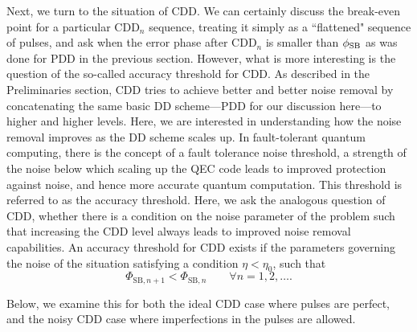 \documentclass[pra,reprint,superscriptaddress]{revtex4-2}
\newcommand{\CDDn}{\mathrm{CDD}_n}
\begin{document}



Next, we turn to the situation of CDD. We can certainly discuss the break-even point for a particular $\CDDn$ sequence, treating it simply as a ``flattened" sequence of pulses, and ask when the error phase after $\CDDn$ is smaller than $\phi_{\mathrm{SB}}$ as was done for PDD in the previous section. 
However, what is more interesting is the question of the so-called accuracy threshold for CDD.
As described in the Preliminaries section, CDD tries to achieve better and better noise removal by concatenating the same basic DD scheme---PDD for our discussion here---to higher and higher levels. Here, we are interested in understanding how the noise removal improves as the DD scheme scales up. In fault-tolerant quantum computing, there is the concept of a fault tolerance noise threshold, a strength of the noise below which scaling up the QEC code leads to improved protection against noise, and hence more accurate quantum computation. This threshold is referred to as the accuracy threshold. Here, we ask the analogous question of CDD, whether there is a condition on the noise parameter of the problem such that increasing the CDD level always leads to improved noise removal capabilities. An accuracy threshold for CDD exists if the parameters governing the noise of the situation satisfying a condition $\eta<\eta_0$, such that 
\begin{equation}\label{eq:thresCond}
\Phi_{\mathrm{SB},n+1} < \Phi_{\mathrm{SB},n}\qquad\forall n=1,2,\ldots.
\end{equation}

Below, we examine this for both the ideal CDD case where pulses are perfect, and the noisy CDD case where imperfections in the pulses are allowed.

\newpage
\end{document}
